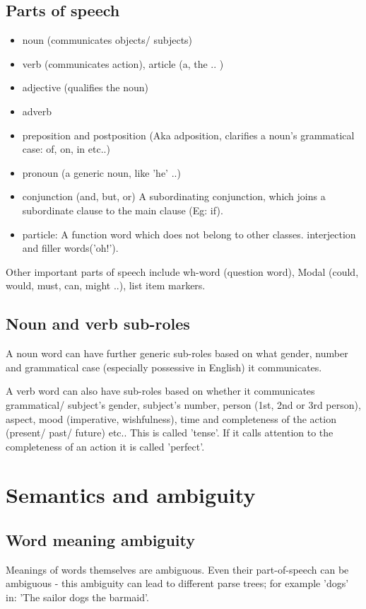 \documentclass[oneside, article]{memoir}
\begin{document}
\subsection{Parts of speech}
\begin{itemize}
\item noun (communicates objects/ subjects)
\item verb (communicates action), article (a, the .. )
\item adjective (qualifies the noun)
\item adverb
\item preposition and postposition (Aka adposition, clarifies a noun's grammatical case: of, on, in etc..)
\item pronoun (a generic noun, like 'he' ..)

\item conjunction (and, but, or)
\subitem A subordinating conjunction, which joins a subordinate clause to the main clause (Eg: if).

\item particle: A function word which does not belong to other classes.
\subitem interjection and filler words('oh!').
\end{itemize}



Other important parts of speech include wh-word (question word), Modal (could, would, must, can, might ..), list item markers. 


\subsection{Noun and verb sub-roles}
A noun word can have further generic sub-roles based on what gender, number and grammatical case (especially possessive in English) it communicates.

A verb word can also have sub-roles based on whether it communicates grammatical/ subject's gender, subject's number, person (1st, 2nd or 3rd person), aspect, mood (imperative, wishfulness), time and completeness of the action (present/ past/ future) etc.. This is called 'tense'. If it calls attention to the completeness of an action it is called 'perfect'.


\section{Semantics and ambiguity}
\subsection{Word meaning ambiguity}
Meanings of words themselves are ambiguous. Even their part-of-speech can be ambiguous - this ambiguity can lead to different parse trees; for example 'dogs' in: 'The sailor dogs the barmaid'.
\end{document}
